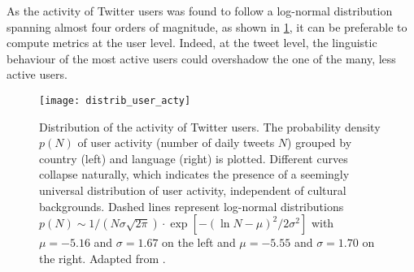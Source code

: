 \documentclass[../thesis.tex]{subfiles}
\begin{document}
As the activity of Twitter users was found to follow a log-normal distribution spanning
almost four orders of magnitude, as shown in \cref{fig:distrib_user_acty}, it can be
preferable to compute metrics at the user level.
Indeed, at the tweet level, the linguistic behaviour
of the most active users could overshadow the one of the many, less active users.
\begin{figure}[hb]
\centering
  \texttt{[image: distrib\_user\_acty]}
  \caption{Distribution of the activity of Twitter users. The probability density $p(N)$
  of user activity (number of daily tweets $N$) grouped by country (left) and language
  (right) is plotted. Different curves collapse naturally, which indicates the presence
  of a seemingly universal distribution of user activity, independent of cultural
  backgrounds. Dashed lines represent log-normal distributions $p(N) \sim 1 / (N \sigma
  \sqrt{2 \pi}) \cdot \exp[-( \ln N - \mu)^2 / 2 \sigma^2]$ with $\mu = -5.16$ and
  $\sigma = 1.67$ on the left and $\mu = -5.55$ and $\sigma = 1.70$ on the right.
  Adapted from \cite{MocanuTwitterBabel2013}.}
  \label{fig:distrib_user_acty}
\end{figure}
\end{document}
